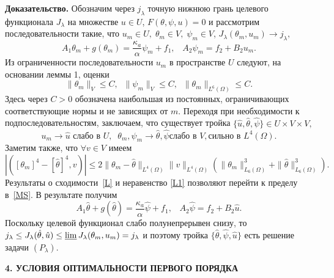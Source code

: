 \documentclass[12pt]{article}
\begin{document}
    \textbf{ Доказательство.}
    Обозначим через
    $j_\lambda $ точную нижнюю грань целевого функционала $J_\lambda$
    на множестве $u \in U$, $F(\theta, \psi, u)=0$ и рассмотрим
    последовательности такие, что
    $u_m \in U, \; \theta_m \in V, \;\psi_m\in V$, $J_\lambda(\theta_m, u_m)
    \rightarrow j_\lambda,$
    \begin{equation}
        \label{MS}
        A_1\theta_m+g(\theta_m)=\frac{\kappa_a}{\alpha}\psi_m+f_1,\;\;\; A_2\psi_m=f_2+B_2u_m.
    \end{equation}
    Из ограниченности последовательности $u_m$ в пространстве $U$ следуют, на основании
    леммы 1, оценки
    \[
        \|\theta_m\|_V \leq C,\;\;
        \|\psi_m\|_V \leq C,\;\;\|\theta_m\|_{L^6(\Omega)} \leq C.
    \]
    Здесь через $C>0$ обозначена наибольшая из постоянных, ограничивающих соответствующие нормы и не зависящих от $m$.
    Переходя при необходимости к подпоследовательностям, заключаем, что
    существует тройка $\{ \hat{u}, \hat{\theta}, \hat{\psi} \} \in U \times V \times V,$
    \begin{equation}
        \label{L}
        u_m \rightarrow \hat{u} \text{  слабо в } U, \;\;
        \theta_m, \psi_m \rightarrow \hat{\theta}, \hat{\psi} \text{
            слабо в } V, \text{
            сильно в } L^4(\Omega).
    \end{equation}
    Заметим также, что $\forall v \in V$ имеем
    \begin{equation}
        \label{L1}
        |( [\theta_m]^4 - [\hat{\theta}]^4, v)|
        \leq 2 \| \theta_m - \hat{\theta}\|_{L^4(\Omega)} \|v\|_{L^4(\Omega)}
        \left( \| \theta_m \|^3_{L_6(\Omega)} + \| \hat{\theta} \|^3_{L_6(\Omega)}\right).
    \end{equation}
    Результаты о сходимости~\eqref{L} и неравенство \eqref{L1} позволяют перейти
    к пределу в~\eqref{MS}. В результате получим
    \begin{equation}
        \label{w1}
        A_1 \hat{\theta} + g(\hat{\theta}) = \frac{\kappa_a}{\alpha}\hat{\psi}+f_1,\;\;\; A_2\hat{\psi}=f_2+B_2\hat{u}.
    \end{equation}
    Поскольку целевой функционал слабо полунепрерывен снизу, то   $j_\lambda \leq J_\lambda(\hat{\theta}, \hat{u}) \leq \varliminf J_\lambda(\theta_m, u_m) =
    j_\lambda$ и поэтому
    тройка $\{\hat{\theta}, \hat{\psi}, \hat{u} \}$ есть
    решение задачи $(P_\lambda).$

    \begin{center}
        \textbf{4. УСЛОВИЯ ОПТИМАЛЬНОСТИ ПЕРВОГО ПОРЯДКА}
    \end{center}
\end{document}
